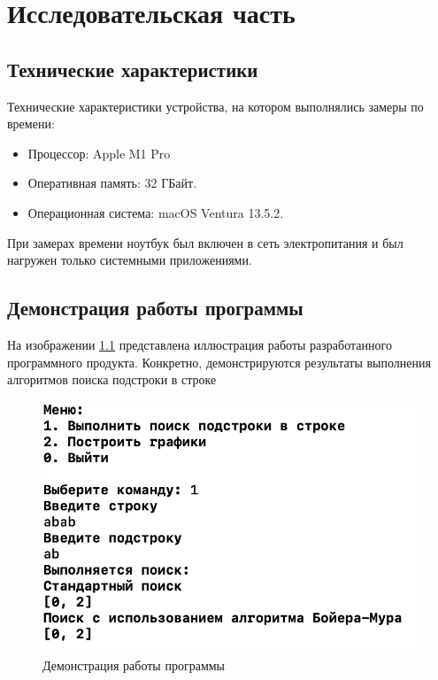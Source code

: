 \chapter{Исследовательская часть}

\section{Технические характеристики}

Технические характеристики устройства, на котором выполнялись замеры по времени:

\begin{itemize}
	\item Процессор: Apple M1 Pro \cite{m1}
	\item Оперативная память: 32 ГБайт.
	\item Операционная система: macOS Ventura 13.5.2. \cite{macOS}
\end{itemize}

При замерах времени ноутбук был включен в сеть электропитания и был нагружен только системными приложениями.

\section{Демонстрация работы программы}

На изображении \ref{img:example} представлена иллюстрация работы разработанного программного продукта. 
Конкретно, демонстрируются результаты выполнения алгоритмов поиска подстроки в строке
\clearpage
\begin{figure}[h]
	\centering
	\includegraphics[height=0.3\textheight]{img/example.png}
	\caption{Демонстрация работы программы}
	\label{img:example}
\end{figure}

